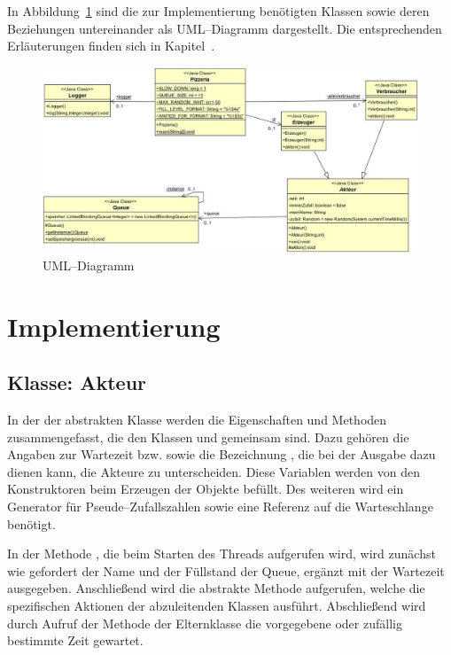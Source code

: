 In Abbildung~\ref{fig:epk} sind die zur Implementierung benötigten Klassen sowie deren Beziehungen untereinander als UML–Diagramm dargestellt. Die entsprechenden Erläuterungen finden sich in Kapitel~.

\label{sub:uml_diagramm}
\begin{figure}[H]
\begin{center}
\includegraphics[width=\textwidth]{UML.jpg}
\caption{UML–Diagramm}
\label{fig:epk}
\end{center}
\end{figure}


\section{Implementierung} %
\label{sec:implementierung}

\subsection{Klasse: Akteur} %
\label{sub:klasse_akteur}
In der der abstrakten Klasse  werden die Eigenschaften und Methoden zusammengefasst, die den Klassen  und  gemeinsam sind. Dazu gehören die Angaben zur Wartezeit  bzw.  sowie die Bezeichnung , die bei der Ausgabe dazu dienen kann, die Akteure zu unterscheiden. Diese Variablen werden von den Konstruktoren beim Erzeugen der Objekte befüllt. Des weiteren wird ein Generator für Pseude–Zufallszahlen sowie eine Referenz auf die Warteschlange benötigt.

In der Methode , die beim Starten des Threads aufgerufen wird, wird zunächst wie gefordert der Name und der Füllstand der Queue, ergänzt mit der Wartezeit ausgegeben. Anschließend wird die abstrakte Methode  aufgerufen, welche die spezifischen Aktionen der abzuleitenden Klassen ausführt. Abschließend wird durch Aufruf der Methode  der Elternklasse  die vorgegebene oder zufällig bestimmte Zeit gewartet.

